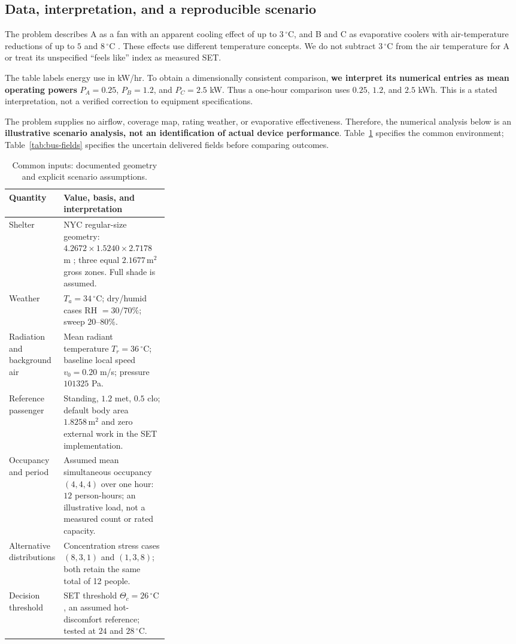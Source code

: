 \documentclass[12pt]{article}
\begin{document}
\subsection{Data, interpretation, and a reproducible scenario}

The problem describes A as a fan with an apparent cooling effect of up to $3\,^{\circ}\mathrm C$, and B and C as evaporative coolers with air-temperature reductions of up to $5$ and $8\,^{\circ}\mathrm C$ \cite{problem}. These effects use different temperature concepts. We do not subtract $3\,^{\circ}\mathrm C$ from the air temperature for A or treat its unspecified ``feels like'' index as measured SET.

The table labels energy use in kW/hr. To obtain a dimensionally consistent comparison, \textbf{we interpret its numerical entries as mean operating powers} $P_A=0.25$, $P_B=1.2$, and $P_C=2.5$ kW. Thus a one-hour comparison uses $0.25$, $1.2$, and $2.5$ kWh. This is a stated interpretation, not a verified correction to equipment specifications.

The problem supplies no airflow, coverage map, rating weather, or evaporative effectiveness. Therefore, the numerical analysis below is an \textbf{illustrative scenario analysis, not an identification of actual device performance}. Table~\ref{tab:bus-assumptions} specifies the common environment; Table~\ref{tab:bus-fields} specifies the uncertain delivered fields before comparing outcomes.

\begin{table}[!ht]
\centering\small
\caption{Common inputs: documented geometry and explicit scenario assumptions.}
\label{tab:bus-assumptions}
\renewcommand{\arraystretch}{1.12}
\begin{tabularx}{\linewidth}{@{}p{0.31\linewidth}X@{}}
\toprule
Quantity & Value, basis, and interpretation\\
\midrule
Shelter & NYC regular-size geometry: $4.2672\times1.5240\times2.7178$ m \cite{nycshelter}; three equal $2.1677\,\mathrm{m^2}$ gross zones. Full shade is assumed.\\
Weather & $T_a=34\,^{\circ}\mathrm C$; dry/humid cases RH $=30/70\%$; sweep $20$--$80\%$.\\
Radiation and background air & Mean radiant temperature $T_r=36\,^{\circ}\mathrm C$; baseline local speed $v_0=0.20$ m/s; pressure $101325$ Pa.\\
Reference passenger & Standing, $1.2$ met, $0.5$ clo; default body area $1.8258\,\mathrm{m^2}$ and zero external work in the SET implementation.\\
Occupancy and period & Assumed mean simultaneous occupancy $(4,4,4)$ over one hour: $12$ person-hours; an illustrative load, not a measured count or rated capacity.\\
Alternative distributions & Concentration stress cases $(8,3,1)$ and $(1,3,8)$; both retain the same total of 12 people.\\
Decision threshold & SET threshold $\Theta_c=26\,^{\circ}\mathrm C$, an assumed hot-discomfort reference; tested at $24$ and $28\,^{\circ}\mathrm C$.\\
\bottomrule
\end{tabularx}
\end{table}
\end{document}
